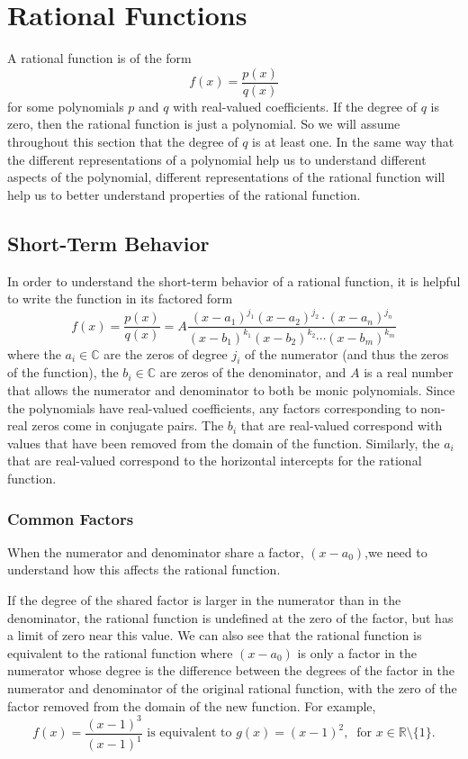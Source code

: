 \documentclass[
]{book}
\theoremstyle{definition}
\theoremstyle{definition}
\theoremstyle{definition}
\theoremstyle{remark}
\begin{document}
\hypertarget{sec:rational-functions}{%
\section{Rational Functions}\label{sec:rational-functions}}

A rational function is of the form
\[f(x)=\frac{p(x)}{q(x)}\] for some polynomials \(p\) and \(q\) with real-valued coefficients. If the degree of \(q\) is zero, then the rational function is just a polynomial. So we will assume throughout this section that the degree of \(q\) is at least one. In the same way that the different representations of a polynomial help us to understand different aspects of the polynomial, different representations of the rational function will help us to better understand properties of the rational function.

\hypertarget{short-term-behavior-1}{%
\subsection{Short-Term Behavior}\label{short-term-behavior-1}}

In order to understand the short-term behavior of a rational function, it is helpful to write the function in its factored form
\[f(x)=\frac{p(x)}{q(x)} = A\frac{ (x-a_1)^{j_1} (x-a_2)^{j_2} \cdot (x-a_n)^{j_n}}{(x-b_1)^{k_1} (x-b_2)^{k_2} \cdots (x-b_m)^{k_m}}\] where the \(a_i\in \mathbb{C}\) are the zeros of degree \(j_i\) of the numerator (and thus the zeros of the function), the \(b_i\in \mathbb{C}\) are zeros of the denominator, and \(A\) is a real number that allows the numerator and denominator to both be monic polynomials. Since the polynomials have real-valued coefficients, any factors corresponding to non-real zeros come in conjugate pairs. The \(b_i\) that are real-valued correspond with values that have been removed from the domain of the function. Similarly, the \(a_i\) that are real-valued correspond to the horizontal intercepts for the rational function.

\hypertarget{common-factors}{%
\subsubsection{Common Factors}\label{common-factors}}

When the numerator and denominator share a factor, \((x-a_0)\),we need to understand how this affects the rational function.

If the degree of the shared factor is larger in the numerator than in the denominator, the rational function is undefined at the zero of the factor, but has a limit of zero near this value. We can also see that the rational function is equivalent to the rational function where \((x-a_0)\) is only a factor in the numerator whose degree is the difference between the degrees of the factor in the numerator and denominator of the original rational function, with the zero of the factor removed from the domain of the new function. For example,
\[f(x)=\frac{(x-1)^3}{(x-1)^1} \mbox{ is equivalent to } g(x)=(x-1)^2, \: \mbox{ for } x\in \mathbb{R}\setminus\{1\}.\]
\end{document}
